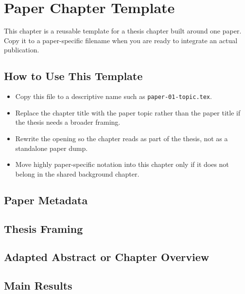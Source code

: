 \chapter{Paper Chapter Template}
\label{chap:paper-template}

This chapter is a reusable template for a thesis chapter built around one paper.
Copy it to a paper-specific filename when you are ready to integrate an actual publication.

\section{How to Use This Template}

\begin{itemize}
  \item Copy this file to a descriptive name such as \texttt{paper-01-topic.tex}.
  \item Replace the chapter title with the paper topic rather than the paper title if the thesis needs a broader framing.
  \item Rewrite the opening so the chapter reads as part of the thesis, not as a standalone paper dump.
  \item Move highly paper-specific notation into this chapter only if it does not belong in the shared background chapter.
\end{itemize}

\section{Paper Metadata}


\section{Thesis Framing}


\section{Adapted Abstract or Chapter Overview}


\section{Main Results}

